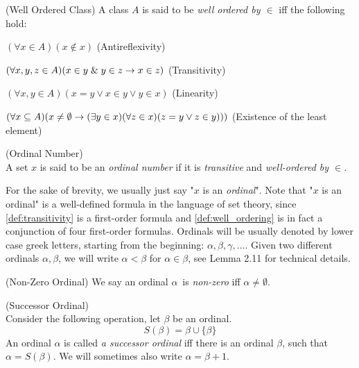 \begin{definition}{(Well Ordered Class)}\label{def:well_ordering} %
A class $A$ is said to be \emph{well ordered by $\in$} iff the following hold:
\bce[(i)]
\item $(\forall x \in A)(x \not\in x)$ (Antireflexivity)
\item $(\forall x, y, z \in A)(x \in y \mathrel{\&} y \in z \rightarrow x \in z)$ (Transitivity)
\item $(\forall x, y \in A)(x = y \lor x \in y \lor y \in x)$ (Linearity)
\item $(\forall x \subseteq A)(x \neq \emptyset \rightarrow (\exists y \in x)(\forall z \in x)(z = y \lor z \in y)))$ (Existence of the least element)
\ece
\end{definition}

\begin{definition}{(Ordinal Number)}\label{def:ordinal}\\ %
A set $x$ is said to be an \emph{ordinal number} if it is \emph{transitive} and \emph{well-ordered by $\in$}. 
\end{definition}
For the sake of brevity, we usually just say "$x$ is an \emph{ordinal}". 
Note that "$x$ is an ordinal" is a well-defined formula in the language of set theory, since \ref{def:transitivity} is a first-order formula and \ref{def:well_ordering} is in fact a conjunction of four first-order formulas.
Ordinals will be usually denoted by lower case greek letters, starting from the beginning: $\alpha, \beta, \gamma, \ldots$.
Given two different ordinals $\alpha, \beta$, we will write $\alpha < \beta$ for $\alpha \in \beta$, see \cite{JechBook}{Lemma 2.11} for technical details.

\begin{definition}{(Non-Zero Ordinal)} %
We say an ordinal $\alpha$ is \emph{non-zero} iff $\alpha \neq \emptyset$.
\end{definition}

\begin{definition}{(Successor Ordinal)}\label{def:successor_ordinal}\\ %
Consider the following operation, let $\beta$ be an ordinal.
\begin{equation}
S(\beta) = \beta \cup \{\beta\}
\end{equation}
An ordinal $\alpha$ is called \emph{a successor ordinal} iff there is an ordinal $\beta$, such that $\alpha = S(\beta)$. We will sometimes also write $\alpha = \beta+1$.
\end{definition}

